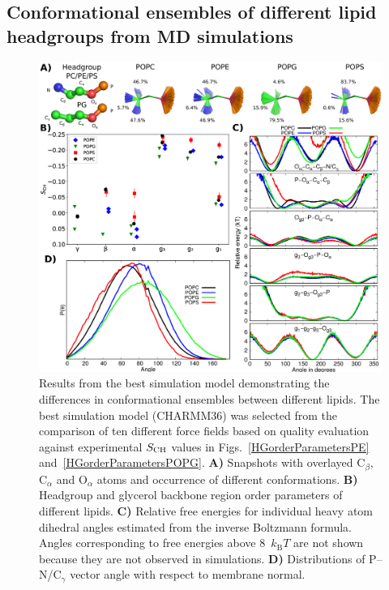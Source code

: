 \documentclass[journal=jpcbfk,manuscript=article]{achemso}
\begin{document}
\subsection{Conformational ensembles of different lipid headgroups from MD simulations}

\begin{figure}
  \centering
   \includegraphics[width=\textwidth]{./Figs/figure2.eps}
   \caption{\label{structures}
     Results from the best simulation model demonstrating the differences in conformational ensembles between different lipids.
     The best simulation model (CHARMM36) was selected from the comparison of ten different force fields based on quality evaluation against experimental $S_{\rm{CH}}$ values in Figs.~\ref{HGorderParametersPE} and~\ref{HGorderParametersPOPG}.
     \textbf{A)} Snapshots with overlayed C$_\beta$, C$_\alpha$ and O$_\alpha$ atoms and occurrence of different conformations.
     \textbf{B)} Headgroup and glycerol backbone region order parameters of different lipids.
     \textbf{C)} Relative free energies for individual heavy atom dihedral angles estimated from the inverse Boltzmann formula.
     Angles corresponding to free energies above 8~$k_\mathrm{B}T$ are not shown because they are not observed in simulations.
     \textbf{D)} Distributions of P--N/C$_\gamma$ vector angle with respect to membrane normal.
  }
\end{figure}
\end{document}
